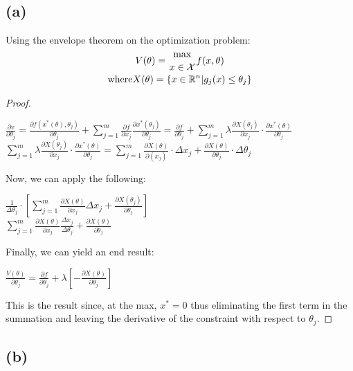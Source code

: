 \documentclass[10pt, a4paper]{article}
\begin{document}
  \subsection*{(a)}
    Using the envelope theorem on the optimization problem:
    \begin{gather*}
      V(\theta)={\max\atop{x\in\mathcal{X}}}f(x,\theta) \\
      \text{where} X(\theta) = \{x\in\mathbb{R}^n|g_j(x)\leq\theta_j\} \\
    \end{gather*}
    \begin{proof}
      \begin{center}
        $\frac{\partial v}{\partial\theta_j} = \frac{\partial f(x^*(\theta),\theta_j)}{\partial\theta_j}
        +\sum\limits_{j=1}^m\frac{\partial f}{\partial x_j}\frac{\partial x^*(\theta_j)}{\partial\theta_j}
        = \frac{\partial f}{\partial\theta_j} + \sum\limits_{j=1}^m\lambda\frac{\partial X(\theta_j)}{\partial x_j}
        \cdot\frac{\partial x^*(\theta)}{\partial\theta_j}$ \\
        $\sum\limits_{j=1}^m\lambda\frac{\partial X(\theta_j)}{\partial x_j}\cdot\frac{\partial x^*(\theta)}{\partial\theta_j}
        = \sum\limits_{j=1}^m\frac{\partial X(\theta)}{\partial(x_j)}\cdot\Delta x_j + \frac{\partial X(\theta)}{\partial\theta_j}\cdot\Delta\theta_j$ \\
      \end{center}
      Now, we can apply the following:
      \begin{center}
        $\frac{1}{\Delta\theta_j}\cdot[\sum\limits_{j=1}^m\frac{\partial X(\theta)}{\partial x_j}\Delta x_j +
        \frac{\partial X(\theta_j)}{\partial\theta_j}]$ \\
        $\sum\limits_{j=1}^m\frac{\partial X(\theta)}{\partial x_j}\frac{\Delta x_j}{\Delta\theta_j} +
        \frac{\partial X(\theta)}{\partial\theta_j}$ \\
      \end{center}
      Finally, we can yield an end result:
      \begin{center}
        $\boxed{\frac{V(\theta)}{\partial\theta_j} = \frac{\partial f}{\partial \theta_j} + \lambda[-\frac{\partial X(\theta)}{\partial\theta_j}]}$
      \end{center}
      This is the result since, at the max, $x^*=0$ thus eliminating the first term in the summation and leaving the derivative of the
      constraint with respect to $\theta_j$.
    \end{proof}
  \subsection*{(b)}
    
\end{document}

